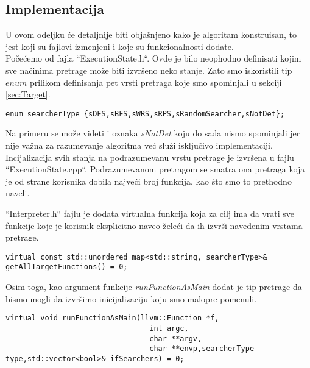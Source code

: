 \documentclass[a4paper]{article}
\begin{document}
\subsection{Implementacija}\label{subsec:impl}
U ovom odeljku će detaljnije biti objašnjeno kako je algoritam konstruisan, to jest koji su fajlovi izmenjeni i koje su funkcionalnosti dodate. \\

Počećemo od fajla ``ExecutionState.h``. Ovde je bilo neophodno definisati kojim sve načinima pretrage može biti izvršeno neko stanje. Zato smo iskoristili tip $enum$ prilikom definisanja pet vrsti pretraga koje smo spominjali u sekciji \ref{sec:Target}.
\begin{lstlisting}
enum searcherType {sDFS,sBFS,sWRS,sRPS,sRandomSearcher,sNotDet};
\end{lstlisting}
Na primeru se može videti i oznaka \textit{sNotDet} koju do sada nismo spominjali jer nije važna za razumevanje algoritma već služi isključivo implementaciji.\\

Incijalizacija svih stanja na podrazumevanu vrstu pretrage je izvršena u fajlu ``ExecutionState.cpp``. Podrazumevanom pretragom se smatra ona pretraga koja je od strane korisnika dobila najveći broj funkcija, kao što smo to prethodno naveli.

``Interpreter.h`` fajlu je dodata virtualna funkcija koja za cilj ima da vrati sve funkcije koje je korisnik eksplicitno naveo želeći da ih izvrši navedenim vrstama pretrage.
\begin{lstlisting}
virtual const std::unordered_map<std::string, searcherType>& getAllTargetFunctions() = 0;
\end{lstlisting}
Osim toga, kao argument funkcije \textit{runFunctionAsMain} dodat je tip pretrage da bismo mogli da izvršimo inicijalizaciju koju smo malopre pomenuli. 
\begin{lstlisting}
virtual void runFunctionAsMain(llvm::Function *f,
                                 int argc,
                                 char **argv,
                                 char **envp,searcherType type,std::vector<bool>& ifSearchers) = 0;
\end{lstlisting}
\end{document}
